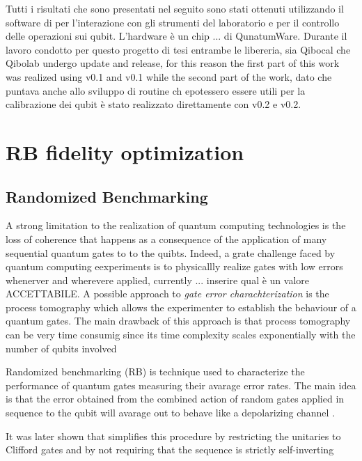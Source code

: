 Tutti i risultati che sono presentati nel seguito sono stati ottenuti utilizzando il software di \Qibolab per l'interazione con gli strumenti del laboratorio e \Qibocal per il controllo delle operazioni sui qubit.
L'hardware è un chip ... di QunatumWare.
Durante il lavoro condotto per questo progetto di tesi entrambe le libereria, sia Qibocal che Qibolab undergo update and release, for this reason the first part of this work was realized using \Qibocal v0.1 and \Qibolab v0.1 while the second part of the work, 
dato che puntava anche allo sviluppo di routine ch epotessero essere utili per la calibrazione dei qubit è stato realizzato direttamente con \Qibocal v0.2 e \Qibolab v0.2. 

\section{RB fidelity optimization}

\subsection{Randomized Benchmarking}\label{RBsection}
A strong limitation to the realization of quantum computing technologies is the loss of coherence that happens as a consequence of the application of many sequential quantum gates to to the quibts.
Indeed, a grate challenge faced by quantum computing eexperiments is to physicallly realize gates with low errors whenerver and wherevere applied, currently ... inserire qual è un valore ACCETTABILE.
A possible approach to \textit{gate error charachterization} is the process tomography which allows the experimenter to establish the behaviour of a quantum gates. 
The main drawback of this approach is that process tomography can be very time consumig since its time complexity scales exponentially with the number of qubits involved \cite{QPTomography}

Randomized benchmarking (RB) is technique used to characterize the performance of quantum gates measuring their avarage error rates.
The main idea is that the error obtained from the combined action of random gates applied in sequence to the qubit will avarage out to behave like a depolarizing channel \cite{Emerson_2005_RB}.

It was later shown that simplifies this procedure by restricting the
unitaries to Clifford gates and by not requiring that the sequence is strictly self-inverting

